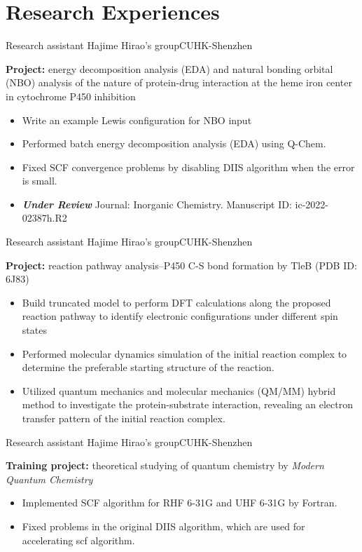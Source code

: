 \documentclass[12pt,a4paper,sans]{moderncv}
\newcommand{\cvsection}[1]{\section{{#1}}}
\begin{document}
\vspace{-1em}
\cvsection{Research Experiences}
    {Research assistant}{}
    {Hajime Hirao's group}{CUHK-Shenzhen}
    {\small
    \textbf{Project:} energy decomposition analysis (EDA) and natural bonding orbital (NBO) analysis of
    the nature of protein-drug interaction at the heme iron center in cytochrome P450 inhibition
    \begin{itemize}[itemsep=2pt]
        \item Write an example Lewis configuration for NBO input
        \item Performed batch energy decomposition analysis (EDA) using Q-Chem.
        \item Fixed SCF convergence problems by disabling DIIS algorithm when the error is small.
        \item \textbf{\textit{Under Review}} Journal: Inorganic Chemistry. Manuscript ID: ic-2022-02387h.R2
    \end{itemize}
}
    {Research assistant}{}
    {Hajime Hirao's group}{CUHK-Shenzhen}
    {\small
    \textbf{Project:} reaction pathway analysis--P450 C-S bond formation by TleB (PDB ID: 6J83)
    \begin{itemize}[itemsep=2pt]
        \item Build truncated model to perform DFT calculations along the proposed reaction pathway to
        identify electronic configurations under different spin states
        \item Performed molecular dynamics simulation of the initial reaction complex to determine the preferable starting
        structure of the reaction.
        \item Utilized quantum mechanics and molecular mechanics (QM/MM) hybrid method to investigate the
        protein-substrate interaction, revealing an electron transfer pattern of the initial reaction complex.
    \end{itemize}
}
    {Research assistant}{}
    {Hajime Hirao's group}{CUHK-Shenzhen}
    {\small
    \textbf{Training project:} theoretical studying of quantum chemistry by \textit{Modern Quantum Chemistry}
    \begin{itemize}[itemsep=2pt]
        \item Implemented SCF algorithm for RHF 6-31G  and UHF 6-31G  by Fortran.
        \item Fixed problems in the original DIIS algorithm, which are used for accelerating scf algorithm.
    \end{itemize}
}
\end{document}
